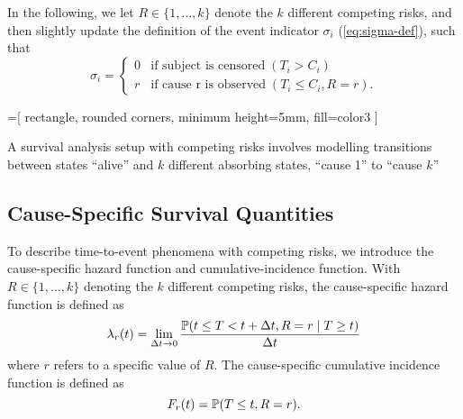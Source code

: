 In the following, 
we let \(R \in \{1, \dots, k\}\) denote the \(k\) different competing risks,
and then slightly update the definition of the event indicator \(\sigma_i\)
(\cref{eq:sigma-def}), such that
\begin{equation}
    \sigma_i =
        \begin{cases}
            0 & \text{if subject is censored} \; (T_i >    C_i) \\
            r & \text{if cause r is observed} \; (T_i \leq C_i, R = r).
        \end{cases}
\end{equation}

\begin{marginfigure}%
    =[%
        rectangle, rounded corners, minimum height=5mm, fill=color3
    ]
    \centering
    \caption[A Multi-State Model]{
        A survival analysis setup with competing risks
        involves modelling transitions between states 
        \enquote{alive} and \(k\) different absorbing
        states, \enquote{cause 1} to \enquote{cause \(k\)}
    }
    \label{fig:msm}
\end{marginfigure}

\subsection{Cause-Specific Survival Quantities}

To describe time-to-event phenomena with competing risks, 
we introduce the cause-specific hazard function and 
cumulative-incidence function.
With \(R \in \{1, \dots, k\}\) denoting the \(k\) different competing risks, 
the cause-specific hazard function is defined as
\begin{equation}
    \lambda_r(t) = \lim_{\Delta t \to 0} 
        \frac{\operatorname{\mathbb{P}} (t \leq T < t + \Delta t, R=r \mid T \geq t)}{\Delta t}
\end{equation}
where \(r\) refers to a specific value of \(R\).
The cause-specific cumulative incidence function is defined as
~\autocite{kalbfleischStatistical2002}
\begin{equation}
    F_r(t) = \operatorname{\mathbb{P}}(T \leq t, R = r).
\end{equation}

